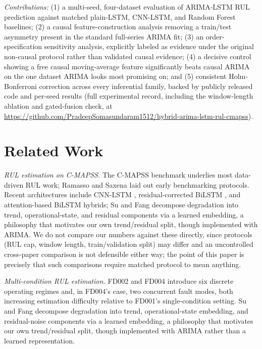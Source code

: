 \documentclass[conference]{IEEEtran}
\newif\ifblind
\begin{document}
\emph{Contributions:} (1) a multi-seed, four-dataset evaluation of ARIMA-LSTM RUL prediction against matched plain-LSTM, CNN-LSTM, and Random Forest baselines; (2) a causal feature-construction analysis removing a train/test asymmetry present in the standard full-series ARIMA fit; (3) an order-specification sensitivity analysis, explicitly labeled as evidence under the original non-causal protocol rather than validated causal evidence; (4) a decisive control showing a free causal moving-average feature significantly beats causal ARIMA on the one dataset ARIMA looks most promising on; and (5) consistent Holm-Bonferroni correction across every inferential family, backed by publicly released code and per-seed results (full experimental record, including the window-length ablation and gated-fusion check, at \ifblind [repository URL withheld for blind review]\else \url{https://github.com/PradeepSomasundaram1512/hybrid-arima-lstm-rul-cmapss}\fi).

\section{Related Work}
\emph{RUL estimation on C-MAPSS.} The C-MAPSS benchmark \cite{saxena2008} underlies most data-driven RUL work; Ramasso and Saxena \cite{cmapssbenchmark2014} laid out early benchmarking protocols. Recent architectures include CNN-LSTM \cite{cnnlstm2024}, residual-corrected BiLSTM \cite{biclstm2026}, and attention-based BiLSTM \cite{sharma2025} hybrids; Su and Fang \cite{multiheadattn2026} decompose degradation into trend, operational-state, and residual components via a learned embedding, a philosophy that motivates our own trend/residual split, though implemented with ARIMA. We do not compare our numbers against these directly, since protocols (RUL cap, window length, train/validation split) may differ and an uncontrolled cross-paper comparison is not defensible either way; the point of this paper is precisely that such comparisons require matched protocol to mean anything.

\emph{Multi-condition RUL estimation.} FD002 and FD004 introduce six discrete operating regimes and, in FD004's case, two concurrent fault modes, both increasing estimation difficulty relative to FD001's single-condition setting. Su and Fang \cite{multiheadattn2026} decompose degradation into trend, operational-state embedding, and residual-noise components via a learned embedding, a philosophy that motivates our own trend/residual split, though implemented with ARIMA rather than a learned representation.
\end{document}
